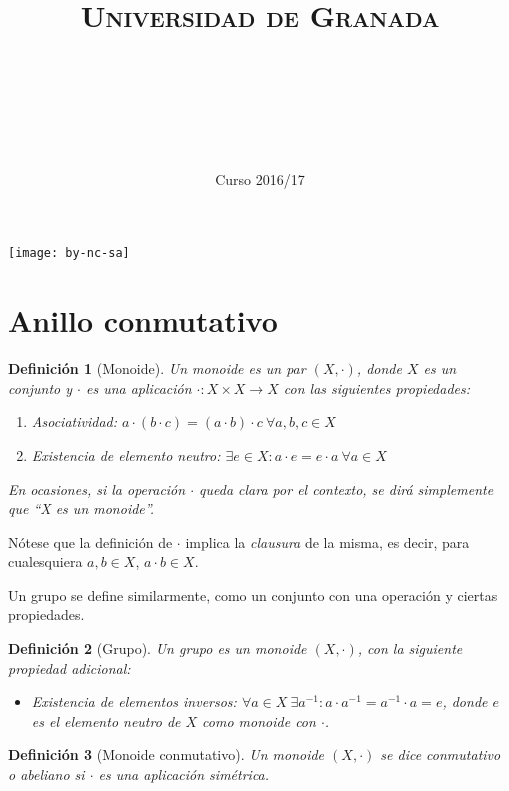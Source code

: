 \documentclass[11pt, a4paper, titlepage]{article}
\title{
  \normalfont \normalsize
  \textsc{Universidad de Granada} \\ [25pt]    %
  \horrule{0.5pt} \\[0.4cm] %
  \huge \subject\\ %
  \horrule{2pt} \\[0.5cm] %
}
\author{\Large{\docauthor}}
\date{\vspace{-1.5em} \normalsize Curso 2016/17}
\newif\IfInSansMode
\theoremstyle{theorem-style}
\theoremstyle{definition-style}
\newtheorem{ndef}{Definición}[section]
\theoremstyle{remark-style}
\theoremstyle{example-style}
\newenvironment{nlist}
{\begin{enumerate}
\renewcommand\labelenumi{(\emph{\roman{enumi})}}}
{\end{enumerate}}
\begin{document}
\maketitle
\tableofcontents
\vfill
\begin{center}
\texttt{[image: by-nc-sa]}  %
\end{center}
\newpage

\section{Anillo conmutativo}

\begin{ndef}[Monoide]
  Un monoide es un par $(X, \cdot)$, donde $X$ es un conjunto y $\cdot$ es una aplicación $\cdot: X\times X\to X$ con las siguientes propiedades:
  \begin{nlist}
  \item Asociatividad: $a\cdot (b \cdot c) = (a \cdot b) \cdot c \ \forall a,b,c \in X$
  \item Existencia de elemento neutro: $\exists e \in X : a \cdot e = e \cdot a \ \forall a \in X$
  \end{nlist}

  En ocasiones, si la operación $\cdot$ queda clara por el contexto, se dirá simplemente que ``X es un monoide''.
\end{ndef}

Nótese que la definición de $\cdot$ implica la \emph{clausura} de la misma, es decir, para cualesquiera $a,b \in X$, $a\cdot b \in X$.

Un grupo se define similarmente, como un conjunto con una operación y ciertas propiedades.

\begin{ndef}[Grupo]
  Un grupo es un monoide $(X, \cdot)$, con la siguiente propiedad adicional:

  \begin{itemize}
  \item Existencia de elementos inversos: $\forall a\in X \ \exists a^{-1} : a\cdot a^{-1} = a^{-1}\cdot a = e$, donde $e$ es el elemento neutro de $X$ como monoide con $\cdot$.
  \end{itemize}

\end{ndef}

\begin{ndef}[Monoide conmutativo]
  Un monoide $(X, \cdot)$ se dice \emph{conmutativo} o \emph{abeliano} si $\cdot$ es una aplicación simétrica.
\end{ndef}
\end{document}
